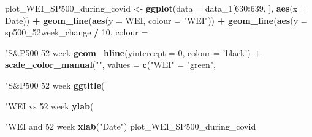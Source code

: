 \documentclass[]{article}
\newenvironment{Shaded}{\begin{snugshade}}{\end{snugshade}}
\newcommand{\KeywordTok}[1]{\textcolor[rgb]{0.13,0.29,0.53}{\textbf{#1}}}
\newcommand{\DataTypeTok}[1]{\textcolor[rgb]{0.13,0.29,0.53}{#1}}
\newcommand{\DecValTok}[1]{\textcolor[rgb]{0.00,0.00,0.81}{#1}}
\newcommand{\StringTok}[1]{\textcolor[rgb]{0.31,0.60,0.02}{#1}}
\newcommand{\OperatorTok}[1]{\textcolor[rgb]{0.81,0.36,0.00}{\textbf{#1}}}
\newcommand{\NormalTok}[1]{#1}
\begin{document}
\begin{Shaded}
\begin{Highlighting}[]
{{{{{{{{{{{{\NormalTok{plot_WEI_SP500_during_covid <-}\StringTok{ }\KeywordTok{ggplot}\NormalTok{(}\DataTypeTok{data =}\NormalTok{ data_}\DecValTok{1}\NormalTok{[}\DecValTok{630}\OperatorTok{:}\DecValTok{639}\NormalTok{, ], }\KeywordTok{aes}\NormalTok{(}\DataTypeTok{x =}\NormalTok{ Date)) }\OperatorTok{+}
\StringTok{  }\KeywordTok{geom_line}\NormalTok{(}\KeywordTok{aes}\NormalTok{(}\DataTypeTok{y =}\NormalTok{ WEI, }\DataTypeTok{colour =} \StringTok{"WEI"}\NormalTok{)) }\OperatorTok{+}\StringTok{ }
\StringTok{  }\KeywordTok{geom_line}\NormalTok{(}\KeywordTok{aes}\NormalTok{(}\DataTypeTok{y =}\NormalTok{ sp500_52week_change }\OperatorTok{/}\StringTok{ }\DecValTok{10}\NormalTok{, }\DataTypeTok{colour =} \StringTok{"S&P500 52 week %change"}\NormalTok{)) }\OperatorTok{+}
\StringTok{  }\KeywordTok{geom_hline}\NormalTok{(}\DataTypeTok{yintercept =} \DecValTok{0}\NormalTok{, }\DataTypeTok{colour =} \StringTok{'black'}\NormalTok{) }\OperatorTok{+}
\StringTok{  }\KeywordTok{scale_color_manual}\NormalTok{(}\StringTok{""}\NormalTok{, }\DataTypeTok{values =} \KeywordTok{c}\NormalTok{(}\StringTok{"WEI"}\NormalTok{ =}\StringTok{ "green"}\NormalTok{, }\StringTok{"S&P500 52 week %change"}\NormalTok{ =}\StringTok{ "blue"}\NormalTok{)) }\OperatorTok{+}\StringTok{ }
\StringTok{  }\KeywordTok{ggtitle}\NormalTok{(}\StringTok{"WEI vs 52 week % change of S&P500 before COVID-19"}\NormalTok{) }\OperatorTok{+}\StringTok{ }
\StringTok{  }\KeywordTok{ylab}\NormalTok{(}\StringTok{"WEI and 52 week % change S&P500"}\NormalTok{) }\OperatorTok{+}\StringTok{ }
\StringTok{  }\KeywordTok{xlab}\NormalTok{(}\StringTok{"Date"}\NormalTok{)}
\NormalTok{plot_WEI_SP500_during_covid}

}}}}}}}}}}}}}}}}
\end{Highlighting}
\end{Shaded}
\end{document}
